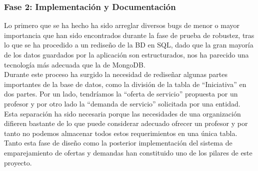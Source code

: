 \documentclass{article}
\begin{document}
\subsubsection{Fase 2: Implementación y Documentación}
Lo primero que se ha hecho ha sido arreglar diversos bugs de menor o mayor importancia que han sido encontrados durante la fase de prueba de robustez, tras lo que se ha procedido a un rediseño de la BD en SQL, dado que la gran mayoría de los datos guardados por la aplicación son estructurados, nos ha parecido una tecnología más adecuada que la de MongoDB.\\
Durante este proceso ha surgido la necesidad de rediseñar algunas partes importantes de la base de datos, como la división de la tabla de ``Iniciativa'' en dos partes. Por un lado, tendríamos la ``oferta de servicio'' propuesta por un profesor y por otro lado la ``demanda de servicio''   solicitada por una entidad. Esta separación ha sido necesaria porque las necesidades de una organización difieren bastante de lo que puede considerar adecuado ofrecer un profesor y por tanto no podemos almacenar todos estos requerimientos en una única tabla.\\
Tanto esta fase de diseño como la posterior implementación del sistema de emparejamiento de ofertas y demandas han constituido uno de los pilares de este proyecto.


\end{document}
